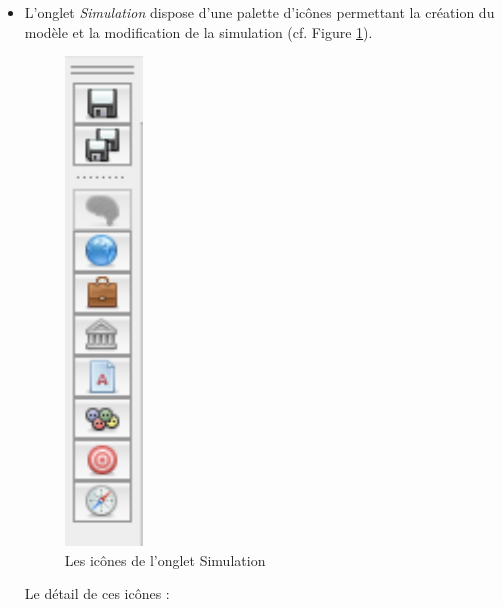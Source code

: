 \documentclass[a4paper,oneside,12 pt]{article}
\begin{document}
\begin{itemize}
\item L'onglet\textit{ Simulation} dispose d'une palette d'icônes permettant la création du modèle et  la modification de la simulation (cf. Figure \ref{IC}).

\begin{figure}[hbtp]
\begin{center}
 \includegraphics [scale=0.6] {icone.pdf}
\end{center}
 \caption{Les icônes de l'onglet Simulation }
 \label{IC}
\end{figure}



Le détail de ces icônes :


\end{itemize}
\end{document}
